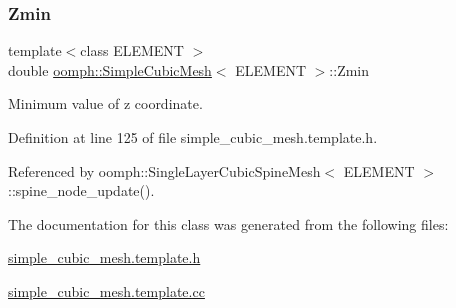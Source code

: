 \subsubsection{\texorpdfstring{Zmin}{Zmin}}
{\footnotesize\ttfamily template$<$class E\+L\+E\+M\+E\+NT $>$ \\
double \hyperlink{classoomph_1_1SimpleCubicMesh}{oomph\+::\+Simple\+Cubic\+Mesh}$<$ E\+L\+E\+M\+E\+NT $>$\+::Zmin\hspace{0.3cm}{\ttfamily [protected]}}



Minimum value of z coordinate. 



Definition at line 125 of file simple\+\_\+cubic\+\_\+mesh.\+template.\+h.



Referenced by oomph\+::\+Single\+Layer\+Cubic\+Spine\+Mesh$<$ E\+L\+E\+M\+E\+N\+T $>$\+::spine\+\_\+node\+\_\+update().



The documentation for this class was generated from the following files\+:\begin{DoxyCompactItemize}
\item 
\hyperlink{simple__cubic__mesh_8template_8h}{simple\+\_\+cubic\+\_\+mesh.\+template.\+h}\item 
\hyperlink{simple__cubic__mesh_8template_8cc}{simple\+\_\+cubic\+\_\+mesh.\+template.\+cc}\end{DoxyCompactItemize}
